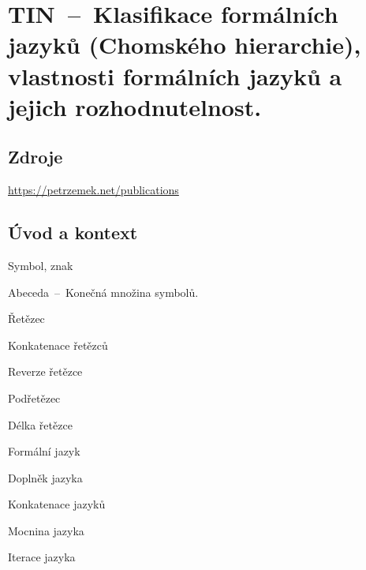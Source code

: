 

\graphicspath{{tin/klasifikace_jazyku/figures}}


\chapter{TIN~--~Klasifikace formálních jazyků (Chomského hierarchie), vlastnosti formálních jazyků a jejich rozhodnutelnost.}



\section{Zdroje}

\begin{compactitem}
    \item {}
    \item {}
    \item {}
    \item {}
    \item {}
    \item {}
    \item \url{https://petrzemek.net/publications}
\end{compactitem}


\section{Úvod a kontext}

\begin{compactitem}
    \item Symbol, znak
    \item Abeceda~--~Konečná množina symbolů.
    \item Řetězec
    \item Konkatenace řetězců
    \item Reverze řetězce
    \item Podřetězec
    \item Délka řetězce
    \item Formální jazyk
    \item Doplněk jazyka
    \item Konkatenace jazyků
    \item Mocnina jazyka
    \item Iterace jazyka
\end{compactitem}

